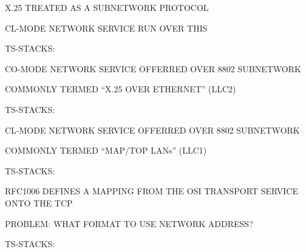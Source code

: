 \begin{bwslide}

\begin{nrtc}
\item	X.25 TREATED AS A SUBNETWORK PROTOCOL

\item	CL-MODE NETWORK SERVICE RUN OVER THIS

\item	TS-STACKS:
\end{nrtc}

\end{bwslide}


\begin{bwslide}

\begin{nrtc}
\item	CO-MODE NETWORK SERVICE OFFERRED OVER 8802 SUBNETWORK

\item	COMMONLY TERMED ``X.25 OVER ETHERNET'' (LLC2)

\item	TS-STACKS:
\end{nrtc}

\end{bwslide}


\begin{bwslide}

\begin{nrtc}
\item	CL-MODE NETWORK SERVICE OFFERRED OVER 8802 SUBNETWORK

\item	COMMONLY TERMED ``MAP/TOP LANs'' (LLC1)

\item	TS-STACKS:
\end{nrtc}

\end{bwslide}


\begin{bwslide}

\begin{nrtc}
\item	RFC1006 DEFINES A MAPPING FROM THE OSI TRANSPORT SERVICE ONTO THE TCP

\item	PROBLEM: WHAT FORMAT TO USE NETWORK ADDRESS?

\item	TS-STACKS:
\end{nrtc}

\end{bwslide}


